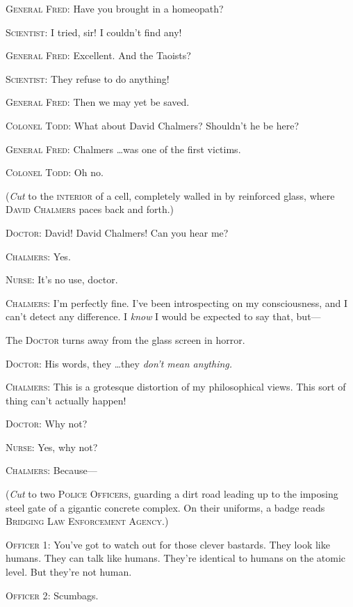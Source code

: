 {
 \textsc{General Fred}: Have you brought in a homeopath?}

{
 \textsc{Scientist}: I tried, sir! I couldn't find any!}

{
 \textsc{General Fred}: Excellent. And the Taoists?}

{
 \textsc{Scientist}: They refuse to do anything!}

{
 \textsc{General Fred}: Then we may yet be saved.}

{
 \textsc{Colonel Todd}: What about David Chalmers? Shouldn't
he be here?}

{
 \textsc{General Fred}: Chalmers \ldots was one of the first victims.}

{
 \textsc{Colonel Todd}: Oh no.}

{
 (\textit{Cut} to the \textsc{interior} of a cell, completely walled in by
reinforced glass, where \textsc{David Chalmers} paces back and forth.)}

{
 \textsc{Doctor}: David! David Chalmers! Can you hear me?}

{
 \textsc{Chalmers}: Yes.}

{
 \textsc{Nurse}: It's no use, doctor.}

{
 \textsc{Chalmers}: I'm perfectly fine. I've
been introspecting on my consciousness, and I can't
detect any difference. I \textit{know} I would be expected to say that,
but---}

{
 The \textsc{Doctor} turns away from the glass screen in horror.}

{
 \textsc{Doctor}: His words, they \ldots they \textit{don't
mean anything.}}

{
 \textsc{Chalmers}: This is a grotesque distortion of my philosophical
views. This sort of thing can't actually happen!}

{
 \textsc{Doctor}: Why not?}

{
 \textsc{Nurse}: Yes, why not?}

{
 \textsc{Chalmers}: Because---}

{
 (\textit{Cut} to two \textsc{Police Officers}, guarding a dirt road leading
up to the imposing steel gate of a gigantic concrete complex. On their
uniforms, a badge reads \textsc{Bridging Law Enforcement Agency}.)}

{
 \textsc{Officer 1}: You've got to watch out for those
clever bastards. They look like humans. They can talk like humans.
They're identical to humans on the atomic level. But
they're not human.}

{
 \textsc{Officer 2}: Scumbags.}

